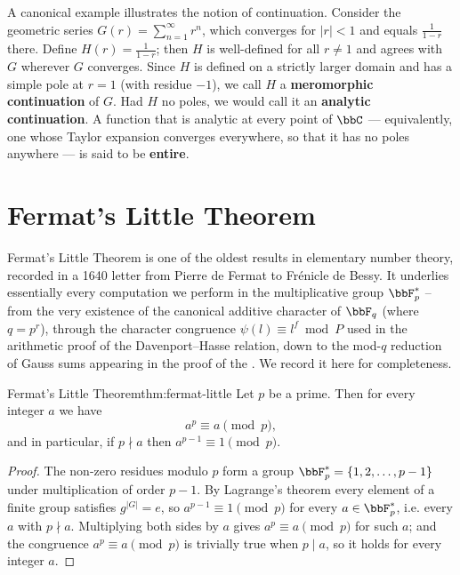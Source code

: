 A canonical example illustrates the notion of continuation. Consider the geometric series $G(r) = \sum_{n=1}^{\infty} r^n$, which converges for $|r| < 1$ and equals $\frac{1}{1-r}$ there. Define $H(r) = \frac{1}{1-r}$; then $H$ is well-defined for all $r \neq 1$ and agrees with $G$ wherever $G$ converges. Since $H$ is defined on a strictly larger domain and has a simple pole at $r = 1$ (with residue $-1$), we call $H$ a \textbf{meromorphic continuation} of $G$. Had $H$ no poles, we would call it an \textbf{analytic continuation}. A function that is analytic at every point of $\bbC$ --- equivalently, one whose Taylor expansion converges everywhere, so that it has no poles anywhere --- is said to be \textbf{entire}.

\section{Fermat's Little Theorem}
Fermat's Little Theorem is one of the oldest results in elementary number theory, recorded in a 1640 letter from Pierre de Fermat to Fr\'{e}nicle de Bessy. It underlies essentially every computation we perform in the multiplicative group $\bbF_p^*$ -- from the very existence of the canonical additive character of $\bbF_q$ (where $q=p^r$), through the character congruence $\psi(l)\equiv l^f\bmod P$ used in the arithmetic proof of the Davenport--Hasse relation, down to the mod-$q$ reduction of Gauss sums appearing in the proof of the \QRthm. We record it here for completeness.
\begin{Theorem}{Fermat's Little Theorem}{thm:fermat-little}%
  Let $p$ be a prime. Then for every integer $a$ we have $$a^p\equiv a\pmod p,$$ and in particular, if $p\nmid a$ then $a^{p-1}\equiv 1\pmod p$.
\end{Theorem}
\begin{proof}
  The non-zero residues modulo $p$ form a group $\bbF_p^*=\{1,2,\dots,p-1\}$ under multiplication of order $p-1$. By Lagrange's theorem every element of a finite group satisfies $g^{|G|}=e$, so $a^{p-1}\equiv 1\pmod p$ for every $a\in\bbF_p^*$, i.e. every $a$ with $p\nmid a$. Multiplying both sides by $a$ gives $a^p\equiv a\pmod p$ for such $a$; and the congruence $a^p\equiv a\pmod p$ is trivially true when $p\mid a$, so it holds for every integer $a$.
\end{proof}
